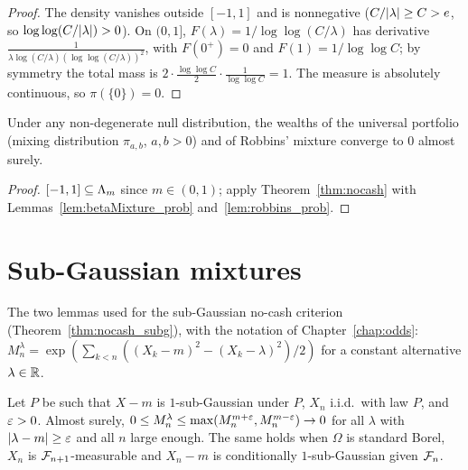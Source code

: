 \begin{proof}
  \leanok
  The density vanishes outside $[-1,1]$ and is nonnegative ($C/\lvert \lambda \rvert \ge C > e$, so
  $\log\log(C/\lvert \lambda \rvert) > 0$). On $(0, 1]$, $F(\lambda) = 1/\log\log(C/\lambda)$ has derivative
  $\frac{1}{\lambda\log(C/\lambda)(\log\log(C/\lambda))^2}$, with $F(0^+) = 0$ and
  $F(1) = 1/\log\log C$; by symmetry the total mass is $2 \cdot \frac{\log\log C}{2} \cdot
  \frac{1}{\log\log C} = 1$. The measure is absolutely continuous, so $\pi(\{0\}) = 0$.
\end{proof}

\begin{proposition}
  \label{prop:mixture_bankrupt}
  \leanok
  Under any non-degenerate null distribution, the wealths of the universal portfolio (mixing
  distribution $\pi_{a,b}$, $a, b > 0$) and of Robbins' mixture converge to $0$ almost surely.
\end{proposition}

\begin{proof}
  \leanok
  $[-1, 1] \subseteq \Lambda_m$ since $m \in (0,1)$; apply Theorem~\ref{thm:nocash} with
  Lemmas~\ref{lem:betaMixture_prob} and~\ref{lem:robbins_prob}.
\end{proof}

\section{Sub-Gaussian mixtures}

The two lemmas used for the sub-Gaussian no-cash criterion (Theorem~\ref{thm:nocash_subg}), with
the notation of Chapter~\ref{chap:odds}: $M^\lambda_n = \exp(\sum_{k<n} ((X_k - m)^2 - (X_k -
\lambda)^2)/2)$ for a constant alternative $\lambda \in \mathbb{R}$.

\begin{lemma}
  \label{lem:mixture_large_subg}
  \leanok
  Let $P$ be such that $X - m$ is $1$-sub-Gaussian under $P$, $X_n$ i.i.d.\ with law $P$, and
  $\varepsilon > 0$. Almost surely, $0 \le M^\lambda_n \le \max(M^{m+\varepsilon}_n, M^{m-\varepsilon}_n) \to 0$ for all
  $\lambda$ with $\lvert \lambda - m \rvert \ge \varepsilon$ and all $n$ large enough. The same holds when
  $\Omega$ is standard Borel, $X_n$ is $\mathcal{F}_{n+1}$-measurable and $X_n - m$ is conditionally
  $1$-sub-Gaussian given $\mathcal{F}_n$.
\end{lemma}

